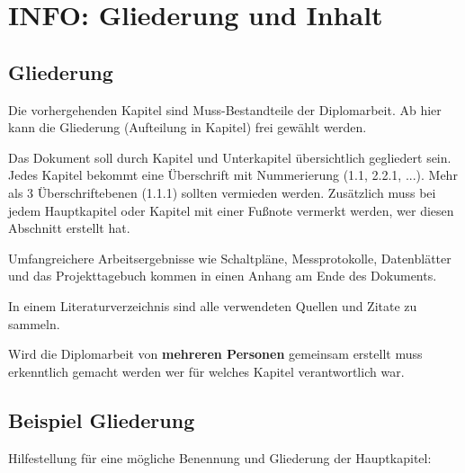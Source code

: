 


\chapter{INFO: Gliederung und Inhalt\authorB}

\section{Gliederung}

Die vorhergehenden Kapitel sind Muss-Bestandteile der Diplomarbeit.
Ab hier kann die Gliederung (Aufteilung in Kapitel) frei gewählt werden.

Das Dokument soll durch Kapitel und Unterkapitel übersichtlich gegliedert sein. 
Jedes Kapitel bekommt eine Überschrift mit Nummerierung (1.1, 2.2.1, ...). Mehr als 3 Überschriftebenen (1.1.1) sollten vermieden werden. Zusätzlich muss bei jedem Hauptkapitel oder Kapitel mit einer Fußnote vermerkt werden, wer diesen Abschnitt erstellt hat.

Umfangreichere Arbeitsergebnisse wie Schaltpläne, Messprotokolle, Datenblätter und das Projekttagebuch kommen in einen Anhang am Ende des Dokuments.

In einem Literaturverzeichnis sind alle verwendeten Quellen und Zitate zu sammeln.

Wird die Diplomarbeit von \textbf{mehreren Personen} gemeinsam erstellt muss erkenntlich gemacht werden wer für welches Kapitel verantwortlich war.

\section{Beispiel Gliederung}

Hilfestellung für eine mögliche Benennung und Gliederung der Hauptkapitel:


